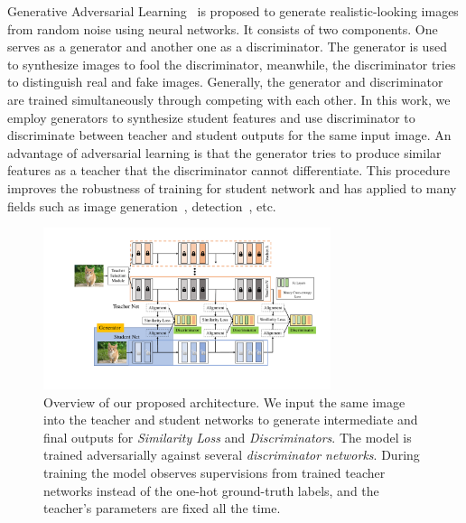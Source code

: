 \documentclass[letterpaper]{article} %
\begin{document}
Generative Adversarial Learning~\cite{goodfellow2014generative} is proposed to generate realistic-looking images from random noise using neural networks. It consists of two components. One serves as a generator and another one as a discriminator. The generator is used to synthesize images to fool the discriminator, meanwhile, the discriminator tries to distinguish real and fake images. Generally, the generator and discriminator are trained simultaneously through competing with each other. In this work, we employ generators to synthesize student features and use discriminator to discriminate between teacher and student outputs for the same input image. An advantage of adversarial learning is that the generator tries to produce similar features as a teacher that the discriminator cannot differentiate. This procedure improves the robustness of training for student network and has applied to many fields such as image generation~\cite{johnson2018image}, detection~\cite{bai2018finding}, etc.

\begin{figure}[t]
	\centering
	\includegraphics[width=0.75\textwidth]{figs/AL}
	\vspace{-0.02in}
	\caption{Overview of our proposed architecture. We input the same image into the teacher and student networks to generate intermediate and final outputs for {\em {Similarity Loss}} and {\em {Discriminators}}. The model is trained adversarially against several {\em {discriminator networks}}. During training the model observes supervisions from trained teacher networks instead of the one-hot ground-truth labels, and the teacher's parameters are fixed all the time.}
	\label{al}
	\vspace{-0.08in}
\end{figure}
\end{document}
